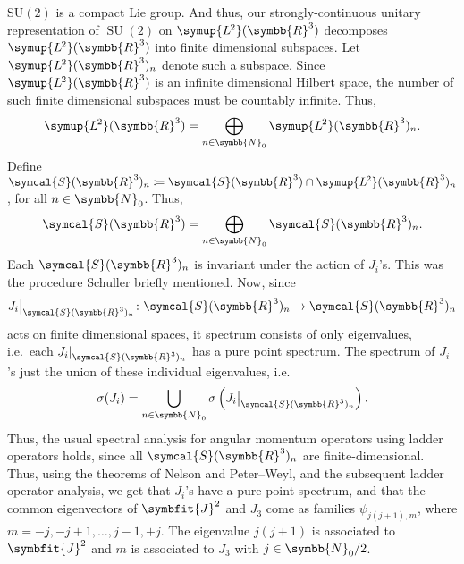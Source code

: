 \documentclass[12pt, a4 paper]{article}
\theoremstyle{definition}
\newcommand{\ltwo}{\symup{L\kern-0.5pt^2}}
\newcommand{\ltworthree}{\ltwo(\rr^3)}
\newcommand{\rr}{\symbb{R}}
\newcommand{\nn}{\symbb{N}_0}
\newcommand{\schwartz}{\symcal{S}}
\newcommand{\schwartzrthree}{\schwartz(\rr^3)}
\newcommand{\spec}{\sigma}
\newcommand{\SUtwo}{\operatorname{SU}(2)}
\newcommand\restr[2]{{%
        \left.\kern-\nulldelimiterspace %
        #1 %
        \littletaller %
        \right|_{#2} %
    }}
\newcommand{\littletaller}{\mathchoice{\vphantom{\big|}}{}{}{}}
\begin{document}
    \(\operatorname{SU(2)}\) is a compact Lie group. And thus, our strongly-continuous unitary representation of \(\SUtwo\) on \(\ltworthree\) decomposes \(\ltworthree\) into finite dimensional subspaces. Let \(\ltworthree_n\) denote such a subspace. Since \(\ltworthree\) is an infinite dimensional Hilbert space, the number of such finite dimensional subspaces must be countably infinite. Thus,
    \[
        \ltworthree = \bigoplus_{n \in \nn} \ltworthree_n.
    \]
    Define \(\schwartzrthree_n \coloneq \schwartzrthree \cap \ltworthree_n\), for all \(n \in \nn\). Thus,
    \[
    \schwartzrthree = \bigoplus_{n \in \nn} \schwartzrthree_n.
    \]
    Each \(\schwartzrthree_n\) is invariant under the action of \(J_i\)'s. This was the procedure Schuller briefly mentioned. Now, since \[\restr{J_i}{\schwartzrthree_n} \colon \schwartzrthree_n \rightarrow \schwartzrthree_n\] acts on finite dimensional spaces, it spectrum consists of only eigenvalues, i.e.\ each \(\restr{J_i}{\schwartzrthree_n}\) has a pure point spectrum. The spectrum of \(J_i\)'s just the union of these individual eigenvalues, i.e.\
    \[
        \spec(J_i) = \bigcup_{n \in \nn} \spec\left(\restr{J_i}{\schwartzrthree_n}\right).
    \]
    Thus, the usual spectral analysis for angular momentum operators using ladder operators holds, since all \(\schwartzrthree_n\) are finite-dimensional. Thus, using the theorems of Nelson and Peter--Weyl, and the subsequent ladder operator analysis, we get that $J_i$'s have a pure point spectrum, and that the common eigenvectors of $\symbfit{J}^2$ and $J_3$ come as families $\psi_{j(j+1), m}$, where $m = -j, -j+1, \ldots, j-1, +j$. The eigenvalue $j(j+1)$ is associated to $\symbfit{J}^2$ and $m$ is associated to $J_3$ with $j \in \symbb{N}_0/2$.
\end{document}
